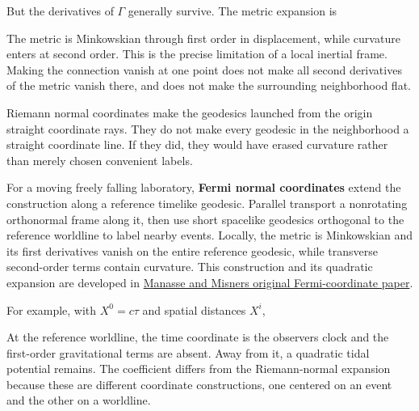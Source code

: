 \documentclass[
  11pt,
  letterpaper,
  oneside,
  openany]{scrbook}
\begin{document}
But the derivatives of \(\Gamma\) generally survive. The metric
expansion is

\begin{center}
\begingroup
{}
\ifdim\wd\grmathbox>\linewidth
\resizebox{\linewidth}{!}{\usebox{\grmathbox}}
\else\usebox{\grmathbox}\fi
\endgroup
\end{center}

The metric is Minkowskian through first order in displacement, while
curvature enters at second order. This is the precise limitation of a
local inertial frame. Making the connection vanish at one point does not
make all second derivatives of the metric vanish there, and does not
make the surrounding neighborhood flat.

Riemann normal coordinates make the geodesics launched from the origin
straight coordinate rays. They do not make every geodesic in the
neighborhood a straight coordinate line. If they did, they would have
erased curvature rather than merely chosen convenient labels.

For a moving freely falling laboratory, \textbf{Fermi normal
coordinates} extend the construction along a reference timelike
geodesic. Parallel transport a nonrotating orthonormal frame along it,
then use short spacelike geodesics orthogonal to the reference worldline
to label nearby events. Locally, the metric is Minkowskian and its first
derivatives vanish on the entire reference geodesic, while transverse
second-order terms contain curvature. This construction and its
quadratic expansion are developed in
\href{https://doi.org/10.1063/1.1724316}{Manasse and
Misner\textquotesingle s original Fermi-coordinate paper}.

For example, with \(X^0=c\tau\) and spatial distances \(X^i\),

\begin{center}
\begingroup
{}
\ifdim\wd\grmathbox>\linewidth
\resizebox{\linewidth}{!}{\usebox{\grmathbox}}
\else\usebox{\grmathbox}\fi
\endgroup
\end{center}

At the reference worldline, the time coordinate is the
observer\textquotesingle s clock and the first-order gravitational terms
are absent. Away from it, a quadratic tidal potential remains. The
coefficient differs from the Riemann-normal expansion because these are
different coordinate constructions, one centered on an event and the
other on a worldline.
\end{document}
